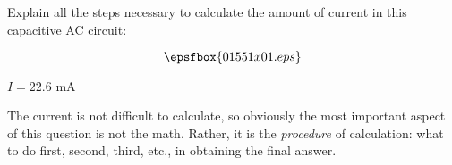

Explain all the steps necessary to calculate the amount of current in this capacitive AC circuit:

$$\epsfbox{01551x01.eps}$$







$I = 22.6$ mA







The current is not difficult to calculate, so obviously the most important aspect of this question is not the math.  Rather, it is the {\it procedure} of calculation: what to do first, second, third, etc., in obtaining the final answer.




